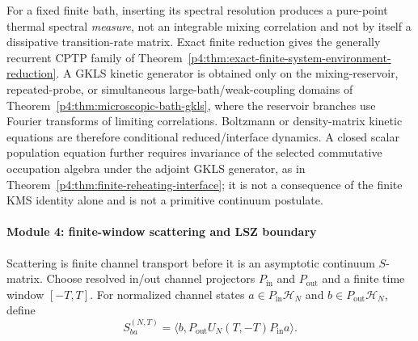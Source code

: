 \documentclass[12pt,a4paper]{article}
\begin{document}
\begin{remark}
\label{p4:rem:finite-kms-kinetic-boundary}
For a fixed finite bath, inserting its spectral resolution produces a
pure-point thermal spectral \emph{measure}, not an integrable mixing
correlation and not by itself a dissipative transition-rate matrix.  Exact
finite reduction gives the generally recurrent CPTP family of
Theorem~\ref{p4:thm:exact-finite-system-environment-reduction}.
A GKLS kinetic generator is obtained only on the mixing-reservoir,
repeated-probe, or simultaneous large-bath/weak-coupling domains of
Theorem~\ref{p4:thm:microscopic-bath-gkls}, where the reservoir branches use
Fourier transforms of limiting correlations.  Boltzmann or density-matrix
kinetic equations are therefore conditional reduced/interface dynamics.  A
closed scalar population equation further requires invariance of the selected
commutative occupation algebra under the adjoint GKLS generator, as in
Theorem~\ref{p4:thm:finite-reheating-interface}; it is not a consequence of
the finite KMS identity alone and is not a primitive continuum postulate.
\end{remark}

\paragraph{Module 4: finite-window scattering and LSZ boundary}
\label{p4:sec:module-finite-scattering-lsz}

Scattering is finite channel transport before it is an asymptotic continuum \(S\)-matrix.  Choose resolved in/out channel projectors \(P_{\mathrm{in}}\) and \(P_{\mathrm{out}}\) and a finite time window \([-T,T]\).  For normalized channel states \(a\in P_{\mathrm{in}}\mathcal H_N\) and \(b\in P_{\mathrm{out}}\mathcal H_N\), define
\begin{equation}
\label{p4:eq:finite-channel-s-matrix-native}
S^{(N,T)}_{ba}
=
\langle b,P_{\mathrm{out}}U_N(T,-T)P_{\mathrm{in}}a\rangle .
\end{equation}
\end{document}
